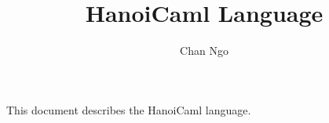 \documentclass[a4paper]{article}
\title{HanoiCaml Language}
\author{Chan Ngo}
\date{}
\begin{document}
\fontsize{10}{14}
\selectfont
\maketitle

This document describes the HanoiCaml language.
\end{document}

